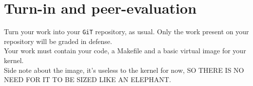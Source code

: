 \documentclass{42-en}
\begin{document}
\chapter{Turn-in and peer-evaluation}

	Turn your work into your \texttt{GiT} repository, as usual.
	Only the work present on your repository will be graded in defense.\\

	Your work must contain your code, a Makefile and a basic virtual
    image for your kernel.\\

	Side note about the image, it's useless to the kernel for now, 
	SO THERE IS NO NEED FOR IT TO BE SIZED LIKE AN ELEPHANT.




\end{document}

